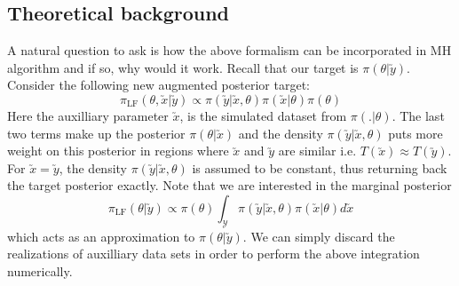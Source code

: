 \begin{multicols}{2}
\subsection{Theoretical background}
A natural question to ask is how the above formalism can be incorporated in MH algorithm and if so, why would it work. Recall that our target is $\pi(\theta|\utilde{y})$. Consider the following new augmented posterior target: \begin{equation}
\pi_{\text{LF}}(\theta,\utilde{x}|\utilde{y}) \propto \pi(\utilde{y}|\utilde{x},\theta)\pi(\utilde{x}|\theta)\pi(\theta)
\end{equation}
Here the auxilliary parameter $\utilde{x}$, is the simulated dataset from $\pi(.|\theta)$. The last two terms make up the posterior $\pi(\theta|\utilde{x})$ and the density $\pi(\utilde{y}|\utilde{x},\theta)$ puts more weight on this posterior in regions where $\utilde{x}$ and $\utilde{y}$ are similar i.e. $T(\utilde{x})\approx T(\utilde{y})$. For $\utilde{x}=\utilde{y}$, the density $\pi(\utilde{y}|\utilde{x},\theta)$ is assumed to be constant, thus returning back the target posterior exactly. Note that we are interested in the marginal posterior \begin{equation}
\label{eq2}
\pi_{\text{LF}}(\theta|\utilde{y}) \propto \pi(\theta) \int_{\mathcal{Y}}\pi(\utilde{y}|\utilde{x},\theta)\pi(\utilde{x}|\theta)d\utilde{x}
\end{equation} which acts as an approximation to $\pi(\theta|\utilde{y})$. We can simply discard the realizations of auxilliary data sets in order to perform the above integration numerically.


\end{multicols}

